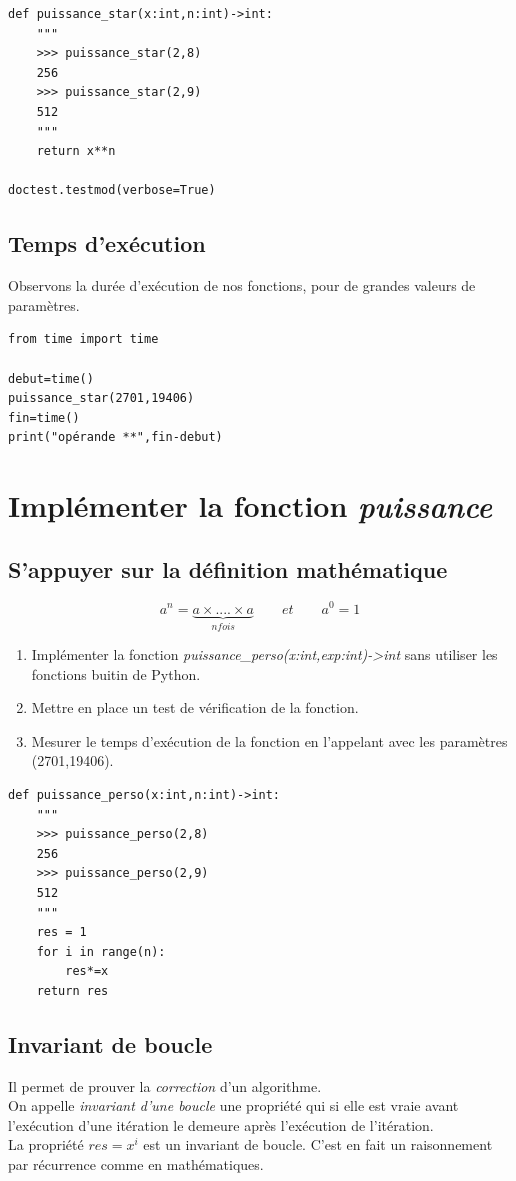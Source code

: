 \documentclass[a4paper,11pt]{article}
\begin{document}
\begin{Form}
\begin{lstlisting}
def puissance_star(x:int,n:int)->int:
    """
    >>> puissance_star(2,8)
    256
    >>> puissance_star(2,9)
    512
    """
    return x**n

doctest.testmod(verbose=True)
\end{lstlisting}
\subsection{Temps d'exécution}
Observons la durée d'exécution de nos fonctions, pour de grandes valeurs de paramètres.
\begin{lstlisting}
from time import time

debut=time()
puissance_star(2701,19406)
fin=time()
print("opérande **",fin-debut)
\end{lstlisting}
\section{Implémenter la fonction \emph{puissance}}
\subsection{S'appuyer sur la définition mathématique}
$$a^n=\underbrace{a ×....× a}_{n fois}\qquad et \qquad a^0=1$$
\begin{activite}
\begin{enumerate}
\item Implémenter la fonction \emph{puissance\_perso(x:int,exp:int)->int} sans utiliser les fonctions buitin de Python.
\item Mettre en place un test de vérification de la fonction.
\item Mesurer le temps d'exécution de la fonction en l'appelant avec les paramètres (2701,19406).
\end{enumerate}
\end{activite}
\begin{lstlisting}
def puissance_perso(x:int,n:int)->int:
    """
    >>> puissance_perso(2,8)
    256
    >>> puissance_perso(2,9)
    512
    """
    res = 1
    for i in range(n):
        res*=x
    return res
\end{lstlisting}
\subsection{Invariant de boucle}
Il permet de prouver la \emph{correction} d'un algorithme.\\
On appelle \emph{invariant d’une boucle} une propriété qui si elle est vraie avant l’exécution d’une itération le demeure après l’exécution de l’itération.\\
La propriété $res = x^i$ est un invariant de boucle. C'est en fait un raisonnement par récurrence comme en mathématiques.

\end{Form}
\end{document}
